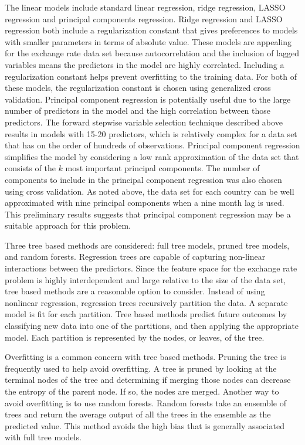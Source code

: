 \documentclass{sig-alternate-05-2015}
\begin{document}
\par{} The linear models include standard linear regression, ridge regression, LASSO regression and principal components regression. Ridge regression and LASSO regression both include a regularization constant that gives preferences to models with smaller parameters in terms of absolute value. These models are appealing for the exchange rate data set because autocorrelation and the inclusion of lagged variables means the predictors in the model are highly correlated. Including a regularization constant helps prevent overfitting to the training data. For both of these models, the regularization constant is chosen using generalized cross validation. Principal component regression is potentially useful due to the large number of predictors in the model and the high correlation between those predictors. The forward stepwise variable selection technique described above results in models with 15-20 predictors, which is relatively complex for a data set that has on the order of hundreds of observations. Principal component regression simplifies the model by considering a low rank approximation of the data set that consists of the $k$ most important principal components. The number of components to include in the principal component regression was also chosen using cross validation. As noted above, the data set for each country can be well approximated with nine principal components when a nine month lag is used. This preliminary results suggests that principal component regression may be a suitable approach for this problem.

\par{} Three tree based methods are considered: full tree models, pruned tree models, and random forests. Regression trees are capable of capturing non-linear interactions between the predictors. Since the feature space for the exchange rate problem is highly interdependent and large relative to the size of the data set, tree based methods are a reasonable option to consider. Instead of using nonlinear regression, regression trees recursively partition the data. A separate model is fit for each partition. Tree based methods predict future outcomes by classifying new data into one of the partitions, and then applying the appropriate model. Each partition is represented by the nodes, or leaves, of the tree. 

\par{} Overfitting is a common concern with tree based methods. Pruning the tree is frequently used to help avoid overfitting. A tree is pruned by looking at the terminal nodes of the tree and determining if merging those nodes can decrease the entropy of the parent node. If so, the nodes are merged. Another way to avoid overfitting is to use random forests. Random forests take an ensemble of trees and return the average output of all the trees in the ensemble as the predicted value. This method avoids the high bias that is generally associated with full tree models.
\end{document}
